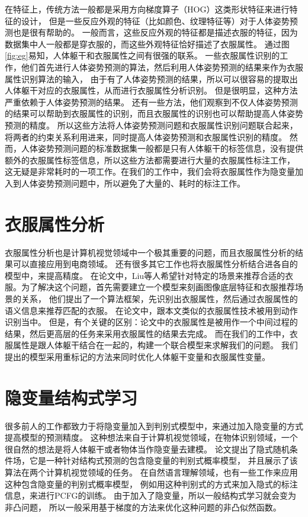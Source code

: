 在特征上，传统方法一般都是采用方向梯度算子（HOG）这类形状特征来进行特征的设计，
但是一些反应外观的特征（比如颜色、纹理特征等）对于人体姿势预测也是很有帮助的\cite{bmvc09}。
一般而言，这些反应外观的特征都是描述衣服的特征，因为数据集中人一般都是穿衣服的，而这些外观特征恰好描述了衣服属性。
通过图\ref{fig:eg}易知，人体躯干和衣服属性之间有很强的联系。
一些衣服属性识别的工作\cite{clotheccv}，他们首先进行人体姿势预测的算法，然后利用人体姿势预测的结果来作为衣服属性识别算法的输入，
由于有了人体姿势预测的结果，所以可以很容易的提取出人体躯干对应的衣服属性，从而进行衣服属性分析识别。
但是很明显，这种方法\cite{clothliu,clothiccv}严重依赖于人体姿势预测的结果。
还有一些方法\cite{cloth12,shen2014unified}，他们观察到不仅人体姿势预测的结果可以帮助到衣服属性的识别，而且衣服属性的识别也可以帮助提高人体姿势预测的精度。
所以这些方法将人体姿势预测问题和衣服属性识别问题联合起来，将两者的约束关系利用进来，同时提高人体姿势预测和衣服属性识别的精度。
然而，人体姿势预测问题的标准数据集一般都是只有人体躯干的标签信息，没有提供额外的衣服属性标签信息，所以这些方法都需要进行大量的衣服属性标注工作，
这无疑是非常耗时的一项工作。在我们的工作中，我们会将衣服属性作为隐变量加入到人体姿势预测问题中，所以避免了大量的、耗时的标注工作。

\section{衣服属性分析}
衣服属性分析也是计算机视觉领域中一个极其重要的问题，而且衣服属性分析的结果可以直接应用到电商领域。
还有很多其它工作也将衣服属性分析结合进各自的模型中，来提高精度。
在论文\cite{clothrec}中，Liu等人希望针对特定的场景来推荐合适的衣服。为了解决这个问题，首先需要建立一个模型来刻画图像底层特征和衣服推荐场景的关系，
他们提出了一个算法框架，先识别出衣服属性，然后通过衣服属性的语义信息来推荐匹配的衣服。
在论文\cite{action}中，跟本文类似的衣服属性技术被用到动作识别当中。
但是，有个关键的区别：论文\cite{action}中的衣服属性是被用作一个中间过程的结果，然后更高层的任务来采用衣服属性的结果去完成。
而在我们的工作中，衣服属性是跟人体躯干结合在一起的，构建一个联合模型来求解我们的问题。
我们提出的模型采用重标记的方法来同时优化人体躯干变量和衣服属性变量。

\section{隐变量结构式学习}
很多前人的工作都致力于将隐变量加入到判别式模型中，来通过加入隐变量的方式提高模型的预测精度。
这种想法来自于计算机视觉领域，在物体识别领域，一个很自然的想法是将人体躯干或者物体当作隐变量去建模。
论文\cite{HCRF}提出了隐式随机条件场，它是一种针对结构式预测的包含隐变量的判别式概率模型，
并且展示了该算法在两个计算机视觉领域的任务。
在自然语言理解领域，也有一些工作\cite{dlglv}来应用这种包含隐变量的判别式概率模型，
例如用这种判别式的方式来加入隐式的标注信息，来进行PCFG的训练。
由于加入了隐变量，所以一般结构式学习就会变为非凸问题，
所以一般采用基于梯度的方法来优化这种问题的非凸似然函数。

